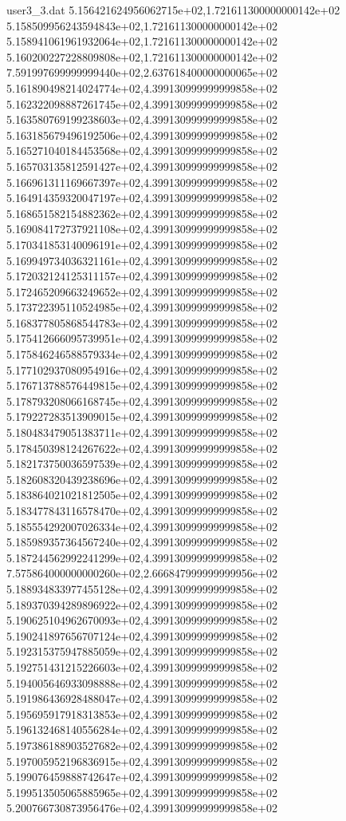 \begin{filecontents}{user3_3.dat}
5.156421624956062715e+02,1.721611300000000142e+02
5.158509956243594843e+02,1.721611300000000142e+02
5.158941061961932064e+02,1.721611300000000142e+02
5.160200227228809808e+02,1.721611300000000142e+02
7.591997699999999440e+02,2.637618400000000065e+02
5.161890498214024774e+02,4.399130999999999858e+02
5.162322098887261745e+02,4.399130999999999858e+02
5.163580769199238603e+02,4.399130999999999858e+02
5.163185679496192506e+02,4.399130999999999858e+02
5.165271040184453568e+02,4.399130999999999858e+02
5.165703135812591427e+02,4.399130999999999858e+02
5.166961311169667397e+02,4.399130999999999858e+02
5.164914359320047197e+02,4.399130999999999858e+02
5.168651582154882362e+02,4.399130999999999858e+02
5.169084172737921108e+02,4.399130999999999858e+02
5.170341853140096191e+02,4.399130999999999858e+02
5.169949734036321161e+02,4.399130999999999858e+02
5.172032124125311157e+02,4.399130999999999858e+02
5.172465209663249652e+02,4.399130999999999858e+02
5.173722395110524985e+02,4.399130999999999858e+02
5.168377805868544783e+02,4.399130999999999858e+02
5.175412666095739951e+02,4.399130999999999858e+02
5.175846246588579334e+02,4.399130999999999858e+02
5.177102937080954916e+02,4.399130999999999858e+02
5.176713788576449815e+02,4.399130999999999858e+02
5.178793208066168745e+02,4.399130999999999858e+02
5.179227283513909015e+02,4.399130999999999858e+02
5.180483479051383711e+02,4.399130999999999858e+02
5.178450398124267622e+02,4.399130999999999858e+02
5.182173750036597539e+02,4.399130999999999858e+02
5.182608320439238696e+02,4.399130999999999858e+02
5.183864021021812505e+02,4.399130999999999858e+02
5.183477843116578470e+02,4.399130999999999858e+02
5.185554292007026334e+02,4.399130999999999858e+02
5.185989357364567240e+02,4.399130999999999858e+02
5.187244562992241299e+02,4.399130999999999858e+02
7.575864000000000260e+02,2.666847999999999956e+02
5.188934833977455128e+02,4.399130999999999858e+02
5.189370394289896922e+02,4.399130999999999858e+02
5.190625104962670093e+02,4.399130999999999858e+02
5.190241897656707124e+02,4.399130999999999858e+02
5.192315375947885059e+02,4.399130999999999858e+02
5.192751431215226603e+02,4.399130999999999858e+02
5.194005646933098888e+02,4.399130999999999858e+02
5.191986436928488047e+02,4.399130999999999858e+02
5.195695917918313853e+02,4.399130999999999858e+02
5.196132468140556284e+02,4.399130999999999858e+02
5.197386188903527682e+02,4.399130999999999858e+02
5.197005952196836915e+02,4.399130999999999858e+02
5.199076459888742647e+02,4.399130999999999858e+02
5.199513505065885965e+02,4.399130999999999858e+02
5.200766730873956476e+02,4.399130999999999858e+02

\end{filecontents}
